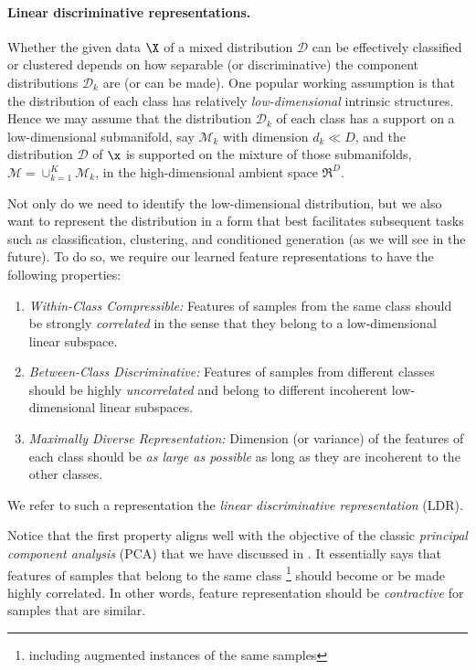 \documentclass[../../book-main.tex]{subfiles}
\begin{document}
\paragraph{Linear discriminative representations.}
Whether the given data $\X$ of a mixed distribution $\mathcal{D}$ can be effectively classified or clustered depends on how separable (or discriminative) the component distributions $\mathcal{D}_k$ are (or can be made). One popular working assumption is that the distribution of each class has relatively {\em low-dimensional} intrinsic structures. Hence we may assume that the distribution $\mathcal{D}_k$ of each class has a support on a low-dimensional submanifold, say $\mathcal{M}_k$ with dimension $d_k \ll D$, and the distribution $\mathcal D$ of $\x$ is supported on the mixture of those submanifolds, $\mathcal M = \cup_{k=1}^K \mathcal{M}_k$,  in the high-dimensional ambient space $\Re^D$.

Not only do we need to identify the low-dimensional distribution, but we also want to represent the distribution in a form that best facilitates subsequent tasks such as classification, clustering, and conditioned generation (as we will see in the future). To do so, we require our learned feature representations to have the following properties:
\begin{enumerate}
	\item {\em Within-Class Compressible:} Features of samples from the same class should be strongly {\em correlated} in the sense that they belong to a low-dimensional linear subspace.
	\item {\em Between-Class Discriminative:} Features of samples from different classes should be highly {\em uncorrelated} and belong to different incoherent low-dimensional linear subspaces.
	\item {\em Maximally Diverse Representation:} Dimension (or variance) of the features of each class should be {\em as large as possible} as long as they are incoherent to the other classes.
\end{enumerate}
We refer to such a representation the {\em linear discriminative representation} (LDR). 

Notice that the first property aligns well with the objective of the classic {\em principal component analysis} (PCA) that we have discussed in . It essentially says that features of samples that belong to the same class \footnote{including augmented instances of the same samples} should become or be made highly correlated. In other words, feature representation should be {\em contractive} for samples that are similar. 
\end{document}
